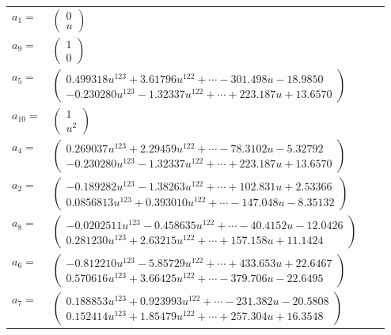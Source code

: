 \documentclass[1p]{elsarticle_modified}
\theoremstyle{definition}
\begin{document}
\begin{tabular}{m{7pt} m{180pt} m{7pt} m{180pt} }
\flushright $a_{1}=$&$\begin{pmatrix}0\\u\end{pmatrix}$ \\
\flushright $a_{9}=$&$\begin{pmatrix}1\\0\end{pmatrix}$ \\
\flushright $a_{5}=$&$\begin{pmatrix}0.499318 u^{123}+3.61796 u^{122}+\cdots-301.498 u-18.9850\\-0.230280 u^{123}-1.32337 u^{122}+\cdots+223.187 u+13.6570\end{pmatrix}$ \\
\flushright $a_{10}=$&$\begin{pmatrix}1\\u^2\end{pmatrix}$ \\
\flushright $a_{4}=$&$\begin{pmatrix}0.269037 u^{123}+2.29459 u^{122}+\cdots-78.3102 u-5.32792\\-0.230280 u^{123}-1.32337 u^{122}+\cdots+223.187 u+13.6570\end{pmatrix}$ \\
\flushright $a_{2}=$&$\begin{pmatrix}-0.189282 u^{123}-1.38263 u^{122}+\cdots+102.831 u+2.53366\\0.0856813 u^{123}+0.393010 u^{122}+\cdots-147.048 u-8.35132\end{pmatrix}$ \\
\flushright $a_{8}=$&$\begin{pmatrix}-0.0202511 u^{123}-0.458635 u^{122}+\cdots-40.4152 u-12.0426\\0.281230 u^{123}+2.63215 u^{122}+\cdots+157.158 u+11.1424\end{pmatrix}$ \\
\flushright $a_{6}=$&$\begin{pmatrix}-0.812210 u^{123}-5.85729 u^{122}+\cdots+433.653 u+22.6467\\0.570616 u^{123}+3.66425 u^{122}+\cdots-379.706 u-22.6495\end{pmatrix}$ \\
\flushright $a_{7}=$&$\begin{pmatrix}0.188853 u^{123}+0.923993 u^{122}+\cdots-231.382 u-20.5808\\0.152414 u^{123}+1.85479 u^{122}+\cdots+257.304 u+16.3548\end{pmatrix}$ \\

\end{tabular}
\end{document}
